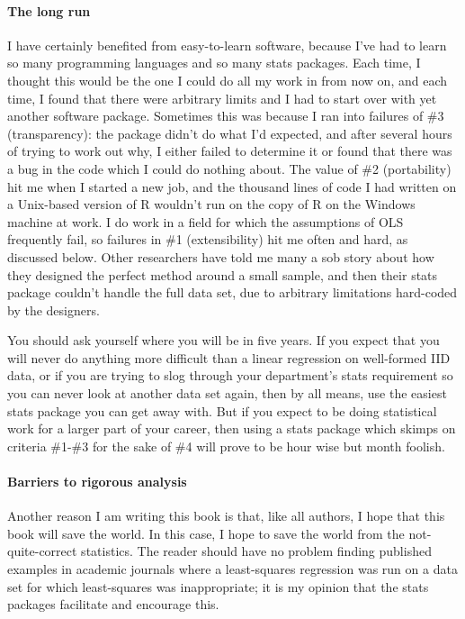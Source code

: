\paragraph{The long run}
I have certainly benefited from easy-to-learn software, because I've had to learn
so many programming languages and so many stats packages. Each time, I thought
this would be the one I could do all my work in from now on, and each time, I
found that there were arbitrary limits and I had to start over with yet another software package.
Sometimes this was because I ran into failures of \#3 (transparency): the package
didn't do what I'd expected, and after several hours of trying to work
out why, I either failed to determine it or found that there was a bug
in the code which I could do nothing about. The value of \#2 (portability) hit me
when I started a new job, and the thousand lines of code I had written on a Unix-based version of R wouldn't run
on the copy of R on the Windows machine at work. I do work in a field for which the
assumptions of OLS frequently fail, so failures in \#1 (extensibility) hit me often and hard,
as discussed below. Other researchers have told me many a sob story
about how they designed the perfect method around a small sample, and
then their stats package couldn't handle the full data set, due to
arbitrary limitations hard-coded by the designers.

You should ask yourself where you will be in five years. If you expect that you will never do
anything more difficult than a linear regression on well-formed IID data,
or if you are trying to slog through your department's stats requirement
so you can never look at another data set again, then by all means,
use the easiest stats package you can get away with. But if you expect to
be doing statistical work for a larger part of your career, then using a
stats package which skimps on criteria \#1-\#3 for the sake of \#4 will
prove to be hour wise but month foolish.

\paragraph{Barriers to rigorous analysis}
Another reason I am writing this book is that, like all authors, I hope
that this book will save the world. In this case, I hope to save the
world from the not-quite-correct statistics.  The reader should have
no problem finding published examples in academic journals where a
least-squares regression was run on a data set for which least-squares
was inappropriate; it is my opinion that the stats packages facilitate
and encourage this.

